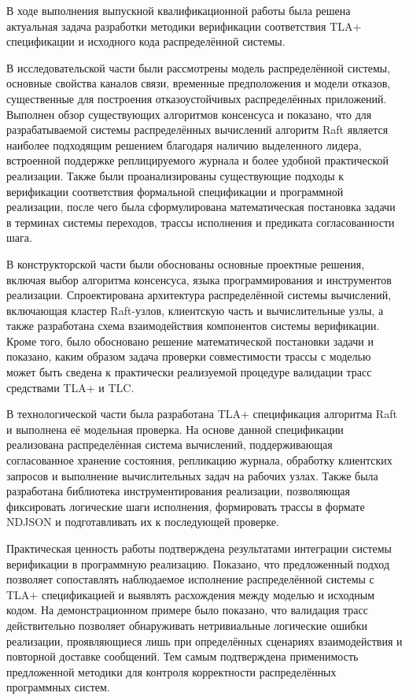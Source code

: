 \conclusion %

В ходе выполнения выпускной квалификационной работы была решена
актуальная задача разработки методики верификации соответствия
TLA+ спецификации и исходного кода распределённой системы.

В исследовательской части были рассмотрены модель распределённой
системы, основные свойства каналов связи, временные предположения и
модели отказов, существенные для построения отказоустойчивых
распределённых приложений. Выполнен обзор существующих алгоритмов
консенсуса и показано, что для разрабатываемой системы распределённых
вычислений алгоритм Raft является наиболее подходящим решением
благодаря наличию выделенного лидера, встроенной поддержке
реплицируемого журнала и более удобной практической реализации.
Также были проанализированы существующие подходы к верификации
соответствия формальной спецификации и программной реализации, после
чего была сформулирована математическая постановка задачи в терминах
системы переходов, трассы исполнения и предиката согласованности
шага.

В конструкторской части были обоснованы основные проектные решения,
включая выбор алгоритма консенсуса, языка программирования и
инструментов реализации. Спроектирована архитектура распределённой
системы вычислений, включающая кластер Raft-узлов, клиентскую часть и
вычислительные узлы, а также разработана схема взаимодействия
компонентов системы верификации. Кроме того, было обосновано решение
математической постановки задачи и показано, каким образом задача
проверки совместимости трассы с моделью может быть сведена к
практически реализуемой процедуре валидации трасс средствами TLA+ и
TLC.

В технологической части была разработана TLA+ спецификация алгоритма
Raft и выполнена её модельная проверка. На основе данной
спецификации реализована распределённая система вычислений,
поддерживающая согласованное хранение состояния, репликацию журнала,
обработку клиентских запросов и выполнение вычислительных задач на
рабочих узлах. Также была разработана библиотека инструментирования
реализации, позволяющая фиксировать логические шаги исполнения,
формировать трассы в формате NDJSON и подготавливать их к
последующей проверке.

Практическая ценность работы подтверждена результатами интеграции
системы верификации в программную реализацию. Показано, что
предложенный подход позволяет сопоставлять наблюдаемое исполнение
распределённой системы с TLA+ спецификацией и выявлять расхождения
между моделью и исходным кодом. На демонстрационном примере было
показано, что валидация трасс действительно позволяет обнаруживать
нетривиальные логические ошибки реализации, проявляющиеся лишь при
определённых сценариях взаимодействия и повторной доставке сообщений.
Тем самым подтверждена применимость предложенной методики для
контроля корректности распределённых программных систем.

